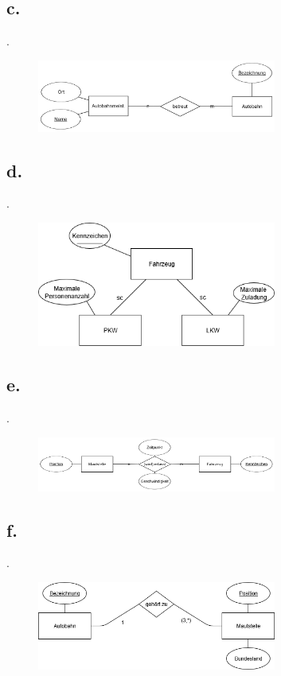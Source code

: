 \documentclass{article}
\begin{document}
		\subsection*{c.}
		.
			\begin{figure}[h]
				\includegraphics[width=0.7\textwidth]{aufgabe_1_2_c.png}
			\end{figure}
			
		
		\newpage
		\subsection*{d.}
		.
			\begin{figure}[h]
					\includegraphics[width=0.7\textwidth]{aufgabe_1_2_d.png}
				\end{figure}
		
		\subsection*{e.}
		.
			\begin{figure}[h]
				\includegraphics[width=0.7\textwidth]{aufgabe_1_2_e.png}
			\end{figure}
		
		\subsection*{f.}
		.
				\begin{figure}[h]
					\includegraphics[width=0.7\textwidth]{aufgabe_1_2_f.png}
	 			\end{figure}
		
\end{document}
